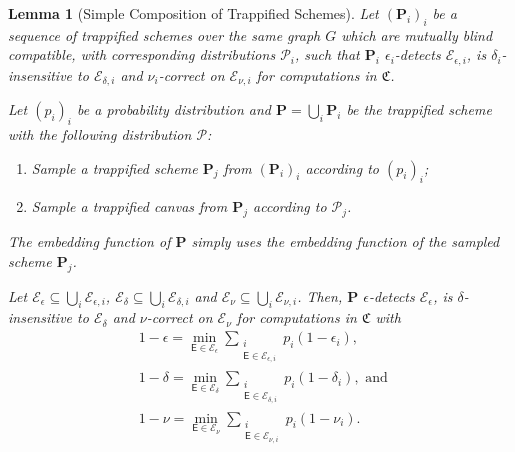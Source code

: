 \documentclass[12pt]{iopart}
\newcommand{\cptp}[1]{\mathsf{#1}} \newcommand{\pd}[1]{\mathcal{#1}}  \newcommand{\sch}[1]{\bm{#1}}
\renewcommand{\1}{\mathds{1}}
\newtheorem{lemma}{Lemma}
\begin{document}
\begin{lemma}[Simple Composition of Trappified Schemes]
\label{lem:compos-sch}
	Let $(\sch P_i)_i$ be a sequence of trappified schemes over the same graph $G$ which are mutually blind compatible, with corresponding distributions $\pd{P}_i$, such that $\sch P_i$ $\epsilon_i$-detects $\mathcal{E}_{\epsilon, i}$, is $\delta_i$-insensitive to $\mathcal{E}_{\delta, i}$ and $\nu_i$-correct on $\mathcal{E}_{\nu, i}$ for computations in $\mathfrak{C}$.
	
	Let $(p_i)_i$ be a probability distribution and $\sch P = \bigcup_i \sch P_i$ be the trappified scheme with the following distribution $\pd{P}$:
	\begin{enumerate}
		\item Sample a trappified scheme $\sch P_j$ from $(\sch P_i)_i$ according to $(p_i)_i$;
		\item Sample a trappified canvas from $\sch P_j$ according to $\mathcal{P}_j$.
	\end{enumerate}
	The embedding function of $\sch P$ simply uses the embedding function of the sampled scheme $\sch P_j$.
	
	Let $\mathcal{E}_\epsilon \subseteq \bigcup_i \mathcal{E}_{\epsilon, i}$, $\mathcal{E}_\delta \subseteq \bigcup_i \mathcal{E}_{\delta, i}$ and $\mathcal{E}_\nu \subseteq \bigcup_i \mathcal{E}_{\nu, i}$.
	Then, $\sch P$ $\epsilon$-detects $\mathcal{E}_\epsilon$, is $\delta$-insensitive to $\mathcal{E}_\delta$ and $\nu$-correct on $\mathcal{E}_\nu$ for computations in $\mathfrak{C}$ with
	\begin{align}
		&1-\epsilon = \min_{\cptp E\in\mathcal{E}_\epsilon} \sum_{\substack{i \\ \cptp E\in\mathcal{E}_{\epsilon, i}}} p_i (1-\epsilon_i), \\
		&1-\delta = \min_{\cptp E\in\mathcal{E}_\delta} \sum_{\substack{i \\ \cptp E\in\mathcal{E}_{\delta, i}}} p_i (1-\delta_i), \mbox{ and }\\
		&1-\nu = \min_{\cptp E\in\mathcal{E}_\nu} \sum_{\substack{i \\ \cptp E\in\mathcal{E}_{\nu, i}}} p_i (1-\nu_i).
	\end{align}
\end{lemma}

 
\end{document}
